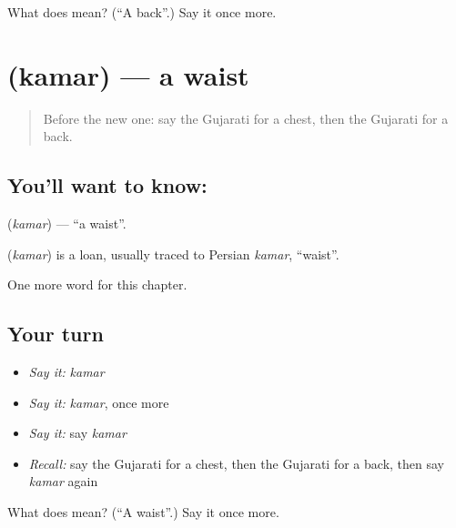 \begin{tcolorbox}[breakable,colback=teal!4,colframe=teal!35!black,title={Before you move on}]
What does  mean? (\textquotedblleft{}A back\textquotedblright{}.) Say it once more.
\end{tcolorbox}
\section[\texorpdfstring{\gu{કમર} (kamar)}{કમર (kamar)}]{ (kamar) — a waist}

\label{lesson:GU-C126-kamar}



\begin{quote}
Before the new one: say the Gujarati for a chest, then the Gujarati for a back.
\end{quote}

\subsection*{You'll want to know: }
\textbf{} (\emph{kamar}) — \textquotedblleft{}a waist\textquotedblright{}.

\begin{cousinweb}
\textbf{} (\emph{kamar}) is a loan, usually traced to Persian \emph{kamar}, \textquotedblleft{}waist\textquotedblright{}.
\end{cousinweb}

\begin{grammarlens}[title={What you've built}]
One more word for this chapter.
\end{grammarlens}

\subsection*{Your turn}
\begin{itemize}
\raggedright
  \item \emph{Say it:} \emph{kamar}
  \item \emph{Say it:} \emph{kamar}, once more
  \item \emph{Say it:} say \emph{kamar}
  \item \emph{Recall:} say the Gujarati for a chest, then the Gujarati for a back, then say \emph{kamar} again
\end{itemize}

\begin{tcolorbox}[breakable,colback=teal!4,colframe=teal!35!black,title={Before you move on}]
What does  mean? (\textquotedblleft{}A waist\textquotedblright{}.) Say it once more.
\end{tcolorbox}
